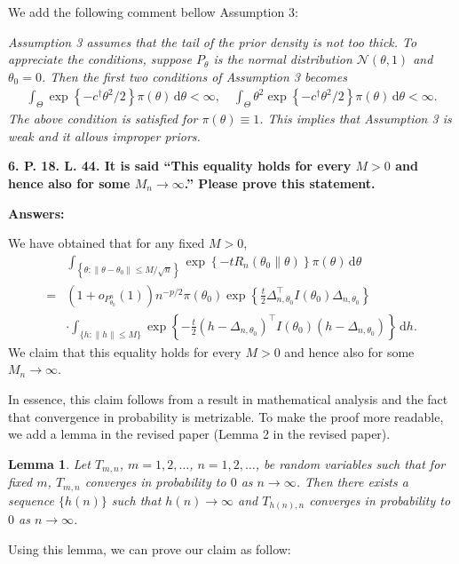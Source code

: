 \documentclass[11pt]{article}
\theoremstyle{plain}
\newtheorem*{lemma}{\quad\quad Lemma}
\theoremstyle{definition}
\theoremstyle{remark}
\begin{document}
We add the following comment bellow Assumption 3:

\begin{adjustwidth}{1.5em}{1.5em}
    \emph{
        Assumption 3 assumes that the tail of the prior density is not too thick.
            To appreciate  the conditions,
            suppose $P_\theta$ is the  normal distribution $ \mathcal N( \theta, 1  )$ and $\theta_0 = 0$.
            Then the first two conditions of Assumption 3 becomes
            \begin{align*}
                    \int_{\Theta} \exp\left\{ -c^\dagger \theta^2 /2 \right\} \pi (\theta) \, \mathrm d \theta < \infty,
                    \quad
                    \int_{\Theta}  \theta^2 \exp\left\{ -c^\dagger \theta^2 /2 \right\} \pi (\theta) \, \mathrm d \theta < \infty.
            \end{align*}
            The above condition is satisfied for $\pi(\theta) \equiv 1$.
            This implies that Assumption 3 is weak and it allows improper priors.
    }
\end{adjustwidth}

\textbf{
6.
P. 18. L. 44.
It is said ``This equality holds for every $M>0$ and hence also for some $M_n \to \infty$.''
Please prove this statement.
}

\textbf{Answers:}

We have obtained that for any fixed $M>0$, 
    \begin{align*}
    & \int_{\left\{ \theta: \|\theta - \theta_0\| \leq M/\sqrt n \right\} }
    \exp \left\{-t R_n(\theta_0\| \theta) \right\} \pi(\theta)
    \, \mathrm d \theta
        \\
        =&
        (1+o_{P^n_{\theta_0}}(1))
        n^{-p/2}\pi(\theta_0)
        \exp\left\{ 
                \frac{t}{2}\Delta_{n,\theta_0}^\top  I({\theta_0})\Delta_{n,\theta_0}
        \right\}
        \\
        &
        \cdot
        \int_{\{h:\|h\|\leq M\}}\exp\left\{ -\frac{t}{2}(h-\Delta_{n,\theta_0})^\top  I({\theta_0})(h-\Delta_{n,\theta_0})\right\} \, \mathrm dh
        .
\end{align*}
We claim that this equality holds for every $M>0$ and hence also for some $M_n \to \infty$.

In essence, this claim follows from a result in mathematical analysis and the fact that convergence in probability is metrizable.
To make the proof more readable, we add a lemma in the revised paper (Lemma 2 in the revised paper).
\begin{lemma}
        Let $T_{m,n}$, $m = 1, 2,\dots$, $n = 1, 2,\dots$, be random variables such that for fixed $m$, $T_{m,n}$ converges in probability to $0$ as $n \to \infty$.
        Then there exists a sequence $\{h(n)\}$ such that $h(n) \to \infty$ and $T_{h(n), n}$ converges in probability to $0$ as $n \to \infty$.
        \label{lemma:MN}
\end{lemma}
Using this lemma, we can prove our claim as follow:
\end{document}
